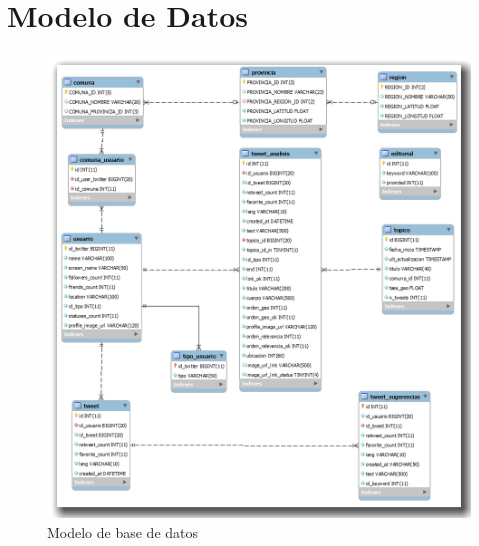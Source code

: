 \section{Modelo de Datos}

\begin{figure}[H]
  \centering
    \includegraphics[width=\textwidth]{imgs/modelo_bd.png}
  \caption{Modelo de base de datos}
  \label{fig:modelo_bd}
\end{figure}
